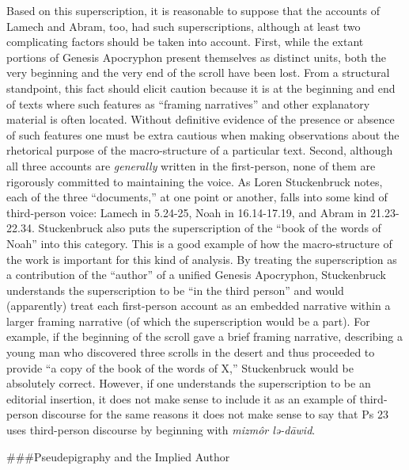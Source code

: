 Based on this superscription, it is reasonable to suppose that the
accounts of Lamech and Abram, too, had such superscriptions, although at
least two complicating factors should be taken into account. First,
while the extant portions of Genesis Apocryphon present themselves as
distinct units, both the very beginning and the very end of the scroll
have been lost. From a structural standpoint, this fact should elicit
caution because it is at the beginning and end of texts where such
features as ``framing narratives'' and other explanatory material is
often located. Without definitive evidence of the presence or absence of
such features one must be extra cautious when making observations about
the rhetorical purpose of the macro-structure of a particular text.
Second, although all three accounts are \emph{generally} written in the
first-person, none of them are rigorously committed to maintaining the
voice. As Loren Stuckenbruck notes, each of the three ``documents,'' at
one point or another, falls into some kind of third-person voice: Lamech
in 5.24-25, Noah in 16.14-17.19, and Abram in 21.23-22.34. Stuckenbruck
also puts the superscription of the ``book of the words of Noah'' into
this category. This is a good example of how the macro-structure of the
work is important for this kind of analysis. By treating the
superscription as a contribution of the ``author'' of a unified
Genesis Apocryphon, Stuckenbruck understands the superscription to be
``in the third person'' and would (apparently) treat each first-person
account as an embedded narrative within a larger framing narrative (of
which the superscription would be a part). For example, if the beginning
of the scroll gave a brief framing narrative, describing a young man who
discovered three scrolls in the desert and thus proceeded to provide ``a
copy of the book of the words of X,'' Stuckenbruck would be absolutely
correct. However, if one understands the superscription to be an
editorial insertion, it does not make sense to include it as an example
of third-person discourse for the same reasons it does not make sense to
say that Ps 23 uses third-person discourse by beginning with
\emph{mizmôr
lə-dāwid}.\autocites[315--316]{stuckenbruck_roitman-etal2011}[See
also][15--16. Even supposing a single author for Genesis Apocryphon, as
Stuckenbruck and others imply, I am still inclined to consider the
superscriptions separately from the former examples because they would
exist outside the frame of each embedded
narrative.]{bernstein_chazon-etal1999}

\#\#\#Pseudepigraphy and the Implied Author

